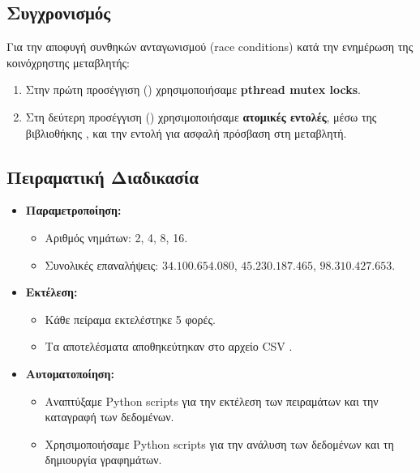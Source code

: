\documentclass{article}
\begin{document}
\subsection*{Συγχρονισμός}
Για την αποφυγή συνθηκών ανταγωνισμού (race conditions) κατά την ενημέρωση της κοινόχρηστης μεταβλητής:
\begin{enumerate}
    \item Στην πρώτη προσέγγιση () χρησιμοποιήσαμε \textbf{pthread mutex locks}.
    \item Στη δεύτερη προσέγγιση () χρησιμοποιήσαμε \textbf{ατομικές εντολές}, μέσω της βιβλιοθήκης , και την εντολή  για ασφαλή πρόσβαση στη μεταβλητή.
\end{enumerate}

\subsection*{Πειραματική Διαδικασία}
\begin{itemize} 
    \item \textbf{Παραμετροποίηση:} 
    \begin{itemize} 
        \item Αριθμός νημάτων: 2, 4, 8, 16. 
        \item Συνολικές επαναλήψεις: $34.100.654.080$, $45.230.187.465$, $98.310.427.653$. 
    \end{itemize} 
    \item \textbf{Εκτέλεση:} 
    \begin{itemize} 
        \item Κάθε πείραμα εκτελέστηκε 5 φορές. 
        \item Τα αποτελέσματα αποθηκεύτηκαν στο αρχείο CSV .
    \end{itemize} 
    \item \textbf{Αυτοματοποίηση:} 
    \begin{itemize} 
        \item Αναπτύξαμε Python scripts για την εκτέλεση των πειραμάτων και την καταγραφή των δεδομένων.
        \item Χρησιμοποιήσαμε Python scripts για την ανάλυση των δεδομένων και τη δημιουργία γραφημάτων.
    \end{itemize} 
\end{itemize}
\end{document}
